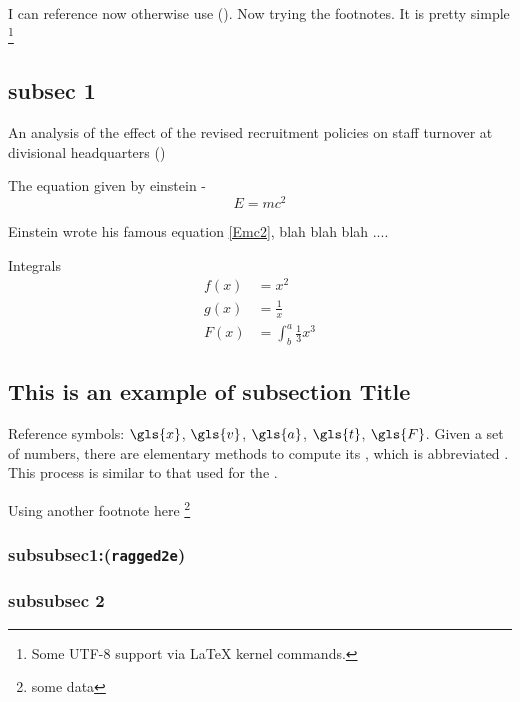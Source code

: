 \documentclass [12pt, a4paper] {article}
\begin{document}
I can reference now otherwise use (\citet{dirac}). Now trying the footnotes. 
It is pretty simple \footnote{Some UTF-8 support via \LaTeX{} kernel commands.}

\subsection{subsec 1}
An analysis of the effect of the revised recruitment policies on staff turnover at divisional headquarters (\citet{einstein})

The equation given by einstein - 
\begin{equation}\label{Emc2}
E=mc^2
\end{equation}

Einstein wrote his famous equation \eqref{Emc2}, blah blah blah ....

Integrals
\begin{align*}
  f(x) &= x^2\\
  g(x) &= \frac{1}{x}\\
  F(x) &= \int^a_b \frac{1}{3}x^3
\end{align*}

\subsection{This is an example of subsection Title}
Reference symbols: $\gls{x}$, $\gls{v}$, $\gls{a}$, $\gls{t}$, $\gls{F}$.
Given a set of numbers, there are elementary methods to compute its , which is abbreviated . This process is similar to that used for the .

Using another footnote here \footnote{some data}

\subsubsection{subsubsec1:(\texttt{ragged2e})}

\begin{Center}
\blindtext[1]
\end{Center}

\subsubsection{subsubsec 2}
\Centering
\blindtext[1]

\vspace{5mm}
\justifying

\blindtext[1]
\lipsum[2]
\end{document}
